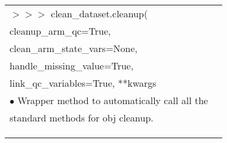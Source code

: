 \documentclass[potrait, z1paper, fontscale=0.33]{baposter} %
\begin{document}
\begin{poster}
{\begin{flushleft}
\begin{tabular}{@{}ll@{}}
$>$$>$$>$ clean\_dataset.cleanup(\\
\-\hspace{1.2cm} cleanup\_arm\_qc=True,\\
\-\hspace{1.2cm} clean\_arm\_state\_vars=None,\\
\-\hspace{1.2cm} handle\_missing\_value=True,\\
\-\hspace{1.2cm} link\_qc\_variables=True, **kwargs\\
\-\hspace{0.2cm} $\bullet$ Wrapper method to automatically call all the\\
\-\hspace{0.5cm} standard methods for obj cleanup.\\
\\
\\
\\
\end{tabular}
\end{flushleft}

}


\end{poster}
\end{document}
